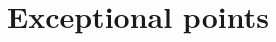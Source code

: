 \documentclass[10pt, a4paper, singlespacing, headsepline]{report}
\newcommand\PT{\emph{PT}}
\begin{document}






\section{Exceptional points}\label{EPs}

\end{document}
